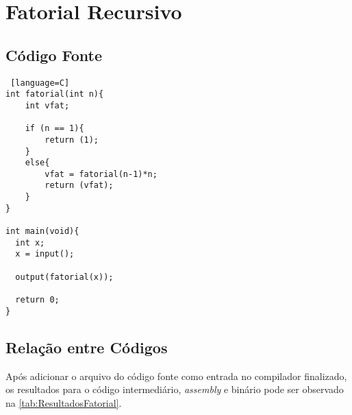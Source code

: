 \documentclass[
	12pt,				%
	oneside,
	a4paper,			%
	english,			%
	french,				%
	spanish,			%
	brazil,				%
	]{abntex2}
\begin{document}
\section{Fatorial Recursivo}

\subsection{Código Fonte}
\begin{lstlisting} [language=C]
int fatorial(int n){
    int vfat; 

    if (n == 1){
        return (1);
    }
    else{
        vfat = fatorial(n-1)*n;
        return (vfat);
    }
}

int main(void){
  int x;
  x = input();

  output(fatorial(x));

  return 0;
}

\end{lstlisting}



\subsection{Relação entre Códigos}

Após adicionar o arquivo do código fonte como entrada no compilador finalizado, os resultados para o código intermediário, \emph{assembly} e binário pode ser observado na \autoref{tab:ResultadosFatorial}.
\end{document}
